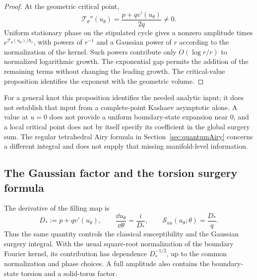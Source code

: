 \begin{proof}
At the geometric critical point,
\[
 \mathcal T_\theta''(u_\theta)
   =\frac{p+qv'(u_\theta)}{2q}\ne0.
\]
Uniform stationary phase on the stipulated cycle gives a nonzero
amplitude times $e^{\mathcal T_\theta(u_\theta)/\hbar_r}$,
with powers of $r^{-1}$ and a Gaussian power of $r$ according
to the normalization of the kernel. Such powers contribute only
$O(\log r/r)$ to normalized logarithmic growth. The exponential
gap permits the addition of the remaining terms without changing
the leading growth. The critical-value proposition identifies the
exponent with the geometric volume.
\end{proof}

For a general knot this proposition identifies the needed analytic
input; it does not establish that input from a complete-point
Kashaev asymptotic alone. A value at $u=0$ does not provide a
uniform boundary-state expansion near $0$, and a local critical
point does not by itself specify its coefficient in the global
surgery sum. The regular tetrahedral Airy formula in
Section~\ref{sec:quantumAiry} concerns a different integral and
does not supply that missing manifold-level information.

\subsection{The Gaussian factor and the torsion surgery formula}

The derivative of the filling map is
\begin{equation}
 D_*:=p+qv'(u_\theta),\qquad
 \frac{\dd u_\theta}{\dd\theta}=\frac{i}{D_*},\qquad
 \mathcal S_{uu}(u_\theta;\theta)=\frac{D_*}{q}.
 \label{eq:dehnjacobian}
\end{equation}
Thus the same quantity controls the classical susceptibility and
the Gaussian surgery integral. With the usual square-root
normalization of the boundary Fourier kernel, its contribution
has dependence $D_*^{-1/2}$, up to the common normalization and
phase choices. A full amplitude also contains the boundary-state
torsion and a solid-torus factor.

